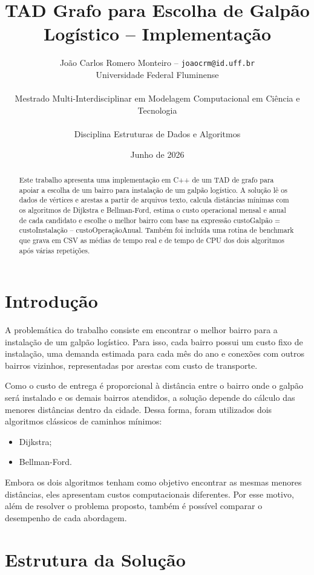 \documentclass[12pt,a4paper]{article}
\title{TAD Grafo para Escolha de Galpão Logístico -- Implementação}
\author{
    João Carlos Romero Monteiro -- \texttt{joaocrm@id.uff.br}\\
    Universidade Federal Fluminense\\
    \parbox{0.85\textwidth}{
        \centering
        Mestrado Multi-Interdisciplinar em Modelagem Computacional em Ciência
        e Tecnologia
    }\\
    Disciplina Estruturas de Dados e Algoritmos
}
\date{Junho de 2026}
\begin{document}
\maketitle

\begin{abstract}
Este trabalho apresenta uma implementação em C++ de um TAD de grafo para apoiar
a escolha de um bairro para instalação de um galpão logístico. A solução lê os
dados de vértices e arestas a partir de arquivos texto, calcula distâncias
mínimas com os algoritmos de Dijkstra e Bellman-Ford, estima o custo
operacional mensal e anual de cada candidato e escolhe o melhor bairro com base
na expressão custoGalpão = custoInstalação – custoOperaçãoAnual. Também foi
incluída uma rotina de benchmark que grava em CSV as médias de tempo real e de
tempo de CPU dos dois algoritmos após várias repetições.
\end{abstract}

\section{Introdução}

A problemática do trabalho consiste em encontrar o melhor bairro para a
instalação de um galpão logístico. Para isso, cada bairro possui um custo fixo
de instalação, uma demanda estimada para cada mês do ano e conexões com outros
bairros vizinhos, representadas por arestas com custo de transporte.

Como o custo de entrega é proporcional à distância entre o bairro onde o galpão
será instalado e os demais bairros atendidos, a solução depende do cálculo das
menores distâncias dentro da cidade. Dessa forma, foram utilizados dois
algoritmos clássicos de caminhos mínimos:

\begin{itemize}[noitemsep]
    \item Dijkstra;
    \item Bellman-Ford.
\end{itemize}

Embora os dois algoritmos tenham como objetivo encontrar as mesmas menores
distâncias, eles apresentam custos computacionais diferentes. Por esse motivo,
além de resolver o problema proposto, também é possível comparar o desempenho
de cada abordagem.

\section{Estrutura da Solução}
\end{document}
